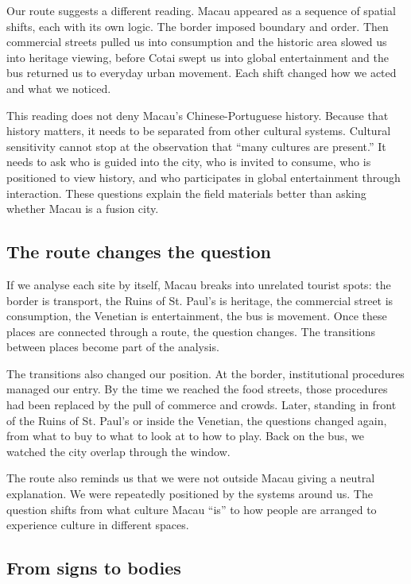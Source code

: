 \documentclass[12pt,a4paper]{article}
\begin{document}
Our route suggests a different reading. Macau appeared as a sequence of spatial shifts, each with its own logic. The border imposed boundary and order. Then commercial streets pulled us into consumption and the historic area slowed us into heritage viewing, before Cotai swept us into global entertainment and the bus returned us to everyday urban movement. Each shift changed how we acted and what we noticed.

This reading does not deny Macau's Chinese-Portuguese history. Because that history matters, it needs to be separated from other cultural systems. Cultural sensitivity cannot stop at the observation that ``many cultures are present.'' It needs to ask who is guided into the city, who is invited to consume, who is positioned to view history, and who participates in global entertainment through interaction. These questions explain the field materials better than asking whether Macau is a fusion city.

\subsection{The route changes the question}

If we analyse each site by itself, Macau breaks into unrelated tourist spots: the border is transport, the Ruins of St. Paul's is heritage, the commercial street is consumption, the Venetian is entertainment, the bus is movement. Once these places are connected through a route, the question changes. The transitions between places become part of the analysis.

The transitions also changed our position. At the border, institutional procedures managed our entry. By the time we reached the food streets, those procedures had been replaced by the pull of commerce and crowds. Later, standing in front of the Ruins of St. Paul's or inside the Venetian, the questions changed again, from what to buy to what to look at to how to play. Back on the bus, we watched the city overlap through the window.

The route also reminds us that we were not outside Macau giving a neutral explanation. We were repeatedly positioned by the systems around us. The question shifts from what culture Macau ``is'' to how people are arranged to experience culture in different spaces.

\subsection{From signs to bodies}
\end{document}
